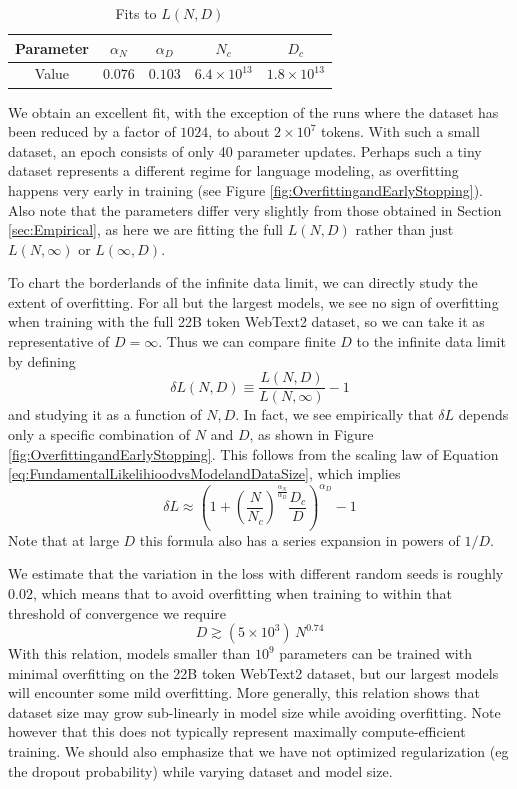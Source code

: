 \documentclass[english]{article}
\newcommand{\be}{\begin{equation}}
\newcommand{\ee}{\end{equation}}
\begin{document}
\begin{table}[h!]
\centering
\vspace{-0.5em}
\begin{tabular}{|c| c | c | c | c|} 
 \hline
Parameter & $\alpha_N$ & $\alpha_D$ & $N_c$ & $D_c$ \\ [0.5ex] 
 \hline\hline
Value  & $0.076$ & $0.103$ & $6.4 \times 10^{13}$ & $1.8 \times 10^{13}$ \\ 
 \hline
\end{tabular}
\vspace{0.5em}
\caption{Fits to $L(N, D)$}
\vspace{-1em}
\end{table}

 We obtain an excellent fit, with the exception of the runs where the dataset has been reduced by a factor of $1024$, to about $2 \times 10^7$ tokens.  With such a small dataset, an epoch consists of only 40 parameter updates.  Perhaps such a tiny dataset represents a different regime for language modeling, as overfitting happens very early in training (see Figure \ref{fig:OverfittingandEarlyStopping}).  Also note that the parameters differ very slightly from those obtained in Section \ref{sec:Empirical}, as here we are fitting the full $L(N,D)$ rather than just $L(N, \infty)$ or $L(\infty, D)$.   



To chart the borderlands of the infinite data limit, we can directly study the extent of overfitting.  For all but the largest models, we see no sign of overfitting when training with the full 22B token WebText2 dataset, so we can take it as representative of $D=\infty$.  Thus we can compare finite $D$ to the infinite data limit by defining
\be
\delta L(N, D) \equiv \frac{L(N, D)}{L(N, \infty)} - 1
\ee
and studying it as a function of $N, D$.   In fact, we see empirically that $\delta L$ depends only a specific combination of $N$ and $D$, as shown in Figure \ref{fig:OverfittingandEarlyStopping}.  This follows from the scaling law of Equation \eqref{eq:FundamentalLikelihioodvsModelandDataSize}, which implies
\be
\label{eq:OverfittingPrediction}
\delta L \approx  \left( 1 +  \left(\frac{N}{N_c} \right)^{\frac{\alpha_N}{\alpha_D}} \frac{D_c}{D} \right)^{\alpha_D} - 1 
\ee
Note that at large $D$ this formula also has a series expansion in powers of $1/D$.

We estimate that the variation in the loss with different random seeds is roughly $0.02$, which means that to avoid overfitting when training to within that threshold of convergence we require 
\be
D \gtrsim (5 \times 10^3) \, N^{0.74}
\ee
With this relation, models smaller than $10^9$ parameters can be trained with minimal overfitting on the 22B token WebText2 dataset, but our largest models will encounter some mild overfitting.  More generally, this relation shows that dataset size may grow sub-linearly in model size while avoiding overfitting.  Note however that this does not typically represent maximally compute-efficient training.  We should also emphasize that we have not optimized regularization (eg the dropout probability) while varying dataset and model size.
\end{document}
